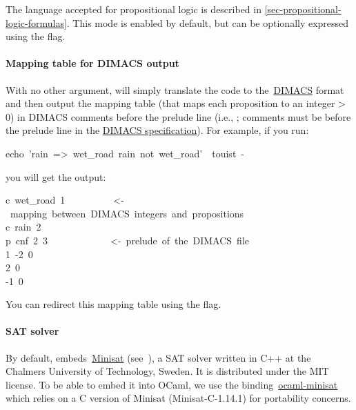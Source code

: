 \noindent The language accepted for propositional logic is described in
\ref{sec-propositional-logic-formulas}. This mode is enabled by
default, but can be optionally expressed using the  flag.%

\paragraph{Mapping table for DIMACS output}\label{mapping-table}%

\noindent With no other argument,  will simply translate the \touist code to
the~\href{http://www.satcompetition.org/2009/format-benchmarks2009.html}{DIMACS} format and then output the mapping table (that maps
each proposition to an integer \textgreater{} 0) in DIMACS comments before the prelude
line (i.e., ; comments must be before the prelude line in the
\href{http://www.satcompetition.org/2009/format-benchmarks2009.html}{DIMACS specification}). For example, if you run:%
\begin{mdpre}%
\noindent{}echo~'rain~=\textgreater{}~wet\_road~rain~not~wet\_road'~\textbar{}~touist~-%
\end{mdpre}\noindent you will get the output:
\begin{mdpre}%
\noindent{}c~wet\_road~1~~~~~~~~~~\textless{}-~mapping~between~DIMACS~integers~and~propositions\\
c~rain~2\\
p~cnf~2~3~~~~~~~~~~~~~\textless{}-~prelude~of~the~DIMACS~file\\
1~-2~0\\
2~0\\
-1~0%
\end{mdpre}\noindent You can redirect this mapping table using the  flag.

\paragraph{SAT solver}\label{usage-sat-solver}%

\noindent By default,  embeds~\href{http://minisat.se}{Minisat}
(see~\cite{Sorensson02minisatv1_13}), a SAT solver written in C++ at the
Chalmers University of Technology, Sweden. It is distributed under the
MIT license. To be able to embed it into OCaml, we use the
binding~\href{https://github.com/c-cube/ocaml-minisat}{ocaml-minisat} which relies on a C version of Minisat
(Minisat-C-1.14.1) for portability concerns.%

